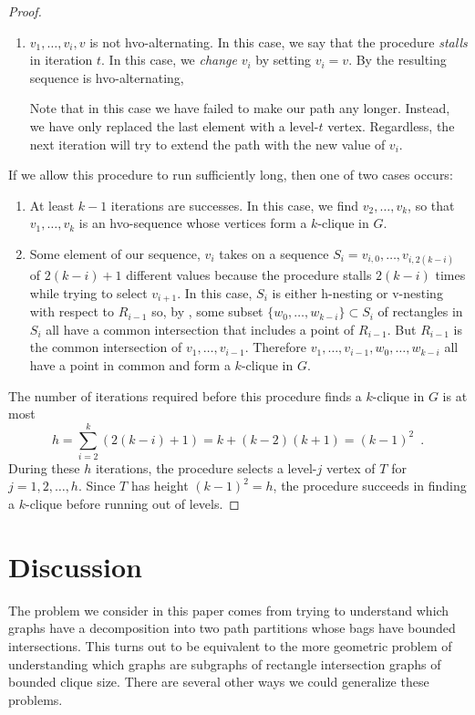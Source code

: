 \documentclass[lotsofwhite]{patmorin}
\begin{document}
\begin{proof}
\begin{enumerate}
     \item $v_1,\ldots,v_i,v$ is not hvo-alternating.  In this case,
       we say that the procedure \emph{stalls} in iteration $t$.
       In this case, we \emph{change} $v_i$ by setting $v_i=v$. By
        the resulting sequence is hvo-alternating,

       Note that in this case we have failed to make our path any
       longer. Instead, we have only replaced the last element with a
       level-$t$ vertex.  Regardless, the next iteration will try to
       extend the path with the new value of $v_i$.
  \end{enumerate}
  If we allow this procedure to run sufficiently long, then one of two
  cases occurs:
  \begin{enumerate}
     \item At least $k-1$ iterations are successes.  In this case, we
     find $v_2,\ldots,v_k$, so that $v_1,\ldots,v_k$ is an hvo-sequence
     whose vertices form a $k$-clique in $G$.

     \item Some element of our sequence, $v_i$ takes on a sequence
     $S_i=v_{i,0},\ldots,v_{i,2(k-i)}$ of $2(k-i)+1$ different values
     because the procedure stalls $2(k-i)$ times while trying to
     select $v_{i+1}$.  In this case, $S_i$ is either h-nesting or
     v-nesting with respect to $R_{i-1}$ so, by , some
     subset $\{w_0,\ldots,w_{k-i}\}\subset S_i$ of rectangles in $S_i$
     all have a common intersection that includes a point of $R_{i-1}$.
     But $R_{i-1}$ is the common intersection of $v_1,\ldots,v_{i-1}$.
     Therefore $v_1,\ldots,v_{i-1},w_{0},\ldots,w_{k-i}$ all have a
     point in common and form a $k$-clique in $G$.
  \end{enumerate}
  The number of iterations required before this procedure finds
  a $k$-clique in $G$ is at most
  \[
      h = \sum_{i=2}^k (2(k-i)+1) = k + (k-2)(k+1) = (k-1)^2 \enspace .
  \]
  During these $h$ iterations, the procedure selects a level-$j$ vertex
  of $T$ for $j=1,2,\ldots,h$.  Since $T$ has height $(k-1)^2 = h$, the
  procedure succeeds in finding a $k$-clique before running out of levels.
\end{proof}

\section{Discussion}

The problem we consider in this paper comes from trying to understand
which graphs have a decomposition into two path partitions whose bags
have bounded intersections.  This turns out to be equivalent to the
more geometric problem of understanding which graphs are subgraphs of
rectangle intersection graphs of bounded clique size.  There are several
other ways we could generalize these problems.
\end{document}
